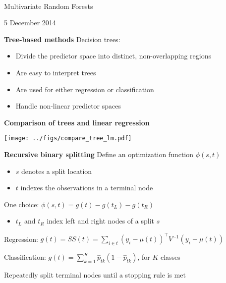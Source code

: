 \documentclass[mathserif, 11pt, t]{beamer}
\renewcommand{\subtitle}[1]{\vspace{0.45cm}\textcolor{bluegreen}{
    {\textbf{#1}}}\vspace{0.15cm}\newline}
\begin{document}
\begin{center}
\ \\ [-0.5in]
\vfill
\bigskip
\bigskip
\bigskip
\bigskip
\bigskip

\begin{LARGE}
Multivariate Random Forests
\end{LARGE}
\vfill
{}
\vfill
5 December 2014
\bigskip
\bigskip
\bigskip
\vfill
\ \\ [-0.5in]
\end{center}

\begin{frame}
\subtitle{Tree-based methods}
Decision trees:
\begin{itemize}[label={$\cdot$}]
\item Divide the predictor space into distinct, non-overlapping regions
\item Are easy to interpret trees
\item Are used for either regression or classification
\item Handle non-linear predictor spaces
\end{itemize}
\end{frame}

\begin{frame}
\subtitle{Comparison of trees and linear regression}
\begin{center}
\texttt{[image: ../figs/compare\_tree\_lm.pdf]}
\end{center}
\end{frame}

\begin{frame}
\subtitle{Recursive binary splitting}
Define an optimization function $\phi(s, t)$
\begin{itemize}[label={$\cdot$}]
\item $s$ denotes a split location
\item $t$ indexes the observations in a terminal node
\end{itemize}
\bigskip

One choice: $\phi(s, t) = g(t) - g(t_L) - g(t_R)$
\begin{itemize}[label={$\cdot$}]
\item $t_L$ and $t_R$ index left and right nodes of a split $s$
\end{itemize}
\bigskip

Regression: $g(t) = SS(t) = \sum_{i\in t}(y_i-\mu(t))^\top V^{-1} (y_i-\mu(t))$
\bigskip

Classification: $g(t) = \sum_{k=1}^K\hat{p}_{tk}(1-\hat{p}_{tk})$, for $K$ classes
\bigskip

Repeatedly split terminal nodes until a stopping rule is met
\end{frame}
\end{document}
